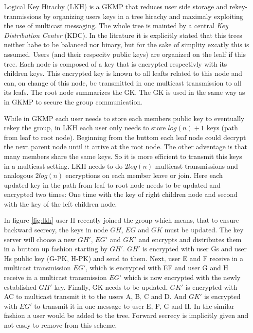 Logical Key Hirachy (\ac{LKH})\cite{wallner1999key} is a \ac{GKMP} that reduces user side storage and rekey-tranmissions by organizing users keys in a tree hirachy and maximaly exploiting the use of multicast messaging. The whole tree is mainted by a central \textit{Key Distribution Center} (\ac{KDC}). In the litrature it is explicitly stated that this trees neither habe to be balanced nor binary, but for the sake of simplity excatly this is assumed. Users (and their respecitv public keys) are organized on the lealf if this tree. Each node is composed of a key that is encrypted respectivly with its children keys. This encrypted key is known to all leafts related to this node and can, on change of this node, be transmitted in one multicast transmission to all its leafs. The root node summarizes the \ac{GK}. The \ac{GK} is used in the same way as in \ac{GKMP} to secure the group communication. 

While in \ac{GKMP} each user needs to store each members public key to eventually rekey the group, in \ac{LKH} each user only needs to store $log(n) +1$ keys (path from leaf to root node). Beginning from the buttom each leaf node could decrypt the next parent node until it arrive at the root node. The other adventage is that many members share the same keys. So it is more efficient to transmit this keys in a multicast setting. \ac{LKH} needs to do $2log(n)$ multicast transmissions and analogous $2log(n)$ encryptions on each member leave or join.  Here each updated key in the path from leaf to root node needs to be updated and encrypted two times: One time with the key of right children node and second with the key of the left children node. 

In figure \ref{fig:lkh} user H recently joined the group which means, that to ensure backward secrecy, the keys in node $GH$, $EG$ and $GK$ must be updated. The key server will choose a new $GH'$, $EG'$ and $GK'$ and encrypts and distributes them in a buttom up fashion starting by $GH'$. $GH'$ is encrypted with user Gs and user Hs public key (G-PK, H-PK) and send to them. Next, user E and F receive in a multicast transmission $EG'$, which is encrypted with EF and user G and H receive in a multicast transmission $EG'$ which is now encrypted with the newly established $GH'$ key. Finally, \ac{GK} needs to be updated. $GK'$ is encrypted with AC to multicast transmit it to the users A, B, C and D. And $GK'$ is encrypted with $EG'$ to transmit it in one message to user E, F, G and H. In the similar fashion a user would be added to the tree. Forward secrecy is implicitly given and not easly to remove from this scheme.

